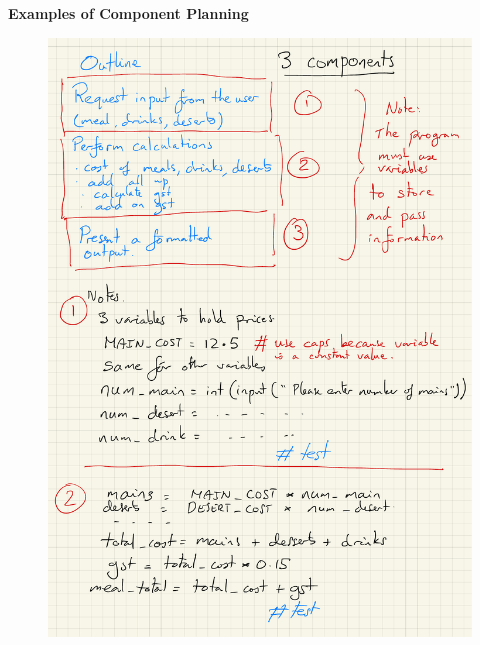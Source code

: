 \documentclass[a4paper,12pt]{article}
\begin{document}
\textbf{Examples of Component Planning}\\
\begin{figure} [!h]
	\centering
	\includegraphics[width=12cm]{iterative_processes/simple_planning_1.pdf}
\end{figure}
\end{document}
